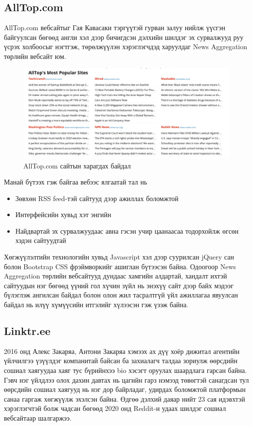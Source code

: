 \subsection{AllTop.com}

AllTop.com вебсайтыг Гая Кавасаки тэргүүтэй гурван залуу нийлж үүсгэн байгуулсан бөгөөд англи хэл дээр бичигдсэн дэлхийн шилдэг эх сурвалжууд руу үсрэх холбоосыг нэгтгэж, төрөлжүүлэн хэрэглэгчдэд харуулдаг News Aggregation төрлийн вебсайт юм. 

\begin{figure}[h]
	\centering
	\includegraphics[width=15cm]{images/alltop.png}
	\caption{AllTop.com сайтын харагдах байдал}
	\label{fig:alltop}
\end{figure}

Манай бүтээх гэж байгаа вебээс ялгаатай тал нь 
\begin{itemize}
	\item Зөвхөн RSS feed-тэй сайтууд дээр ажиллах боломжтой
	\item Интерфейсийн хувьд хэт энгийн
	\item Найдвартай эх сурвалжуудаас авна гэсэн учир цаанаасаа тодорхойлж өгсөн хэдэн сайтуудтай
\end{itemize}

Хөгжүүлэлтийн технологийн хувьд Javascript хэл дээр суурилсан jQuery сан болон Bootstrap CSS фрэймворкийг ашиглан бүтээсэн байна. Одоогоор News Aggregation төрлийн вебсайтууд дундаас хамгийн алдартай, хандалт ихтэй сайтуудын нэг бөгөөд үүний гол хүчин зүйл нь энэхүү сайт дээр байх мэдээг бүлэглэж ангилсан байдал болон олон жил тасралтгүй үйл ажиллагаа явуулсан байдал нь илүү хүмүүсийн итгэлийг хүлээсэн гэж үзэж байна. 

\subsection{Linktr.ee}

2016 онд Алекс Закаряа, Антони Закаряа хэмээх ах дүү хоёр дижитал агентийн үйлчилгээ үзүүлдэг компанитай байсан ба захиалагч талдаа зориулж өөрсдийн сошиал хаягуудаа хаяг тус бүрийнхээ bio хэсэгт оруулах шаардлага гарсан байна. Гэвч нэг үйлдлээ олох дахин давтах нь цагийн гарз нэмээд төвөгтэй санагдсан тул өөрсдийн сошиал хаягууд нь нэг дор байрладаг, удирдах боломжтой платформын санаа гаргаж хөгжүүлж эхэлсэн байна. Өдгөө дэлхий даяар нийт 23 сая идэвхтэй хэрэглэгчтэй болж чадсан бөгөөд 2020 онд Reddit-н удаах шилдэг сошиал вебсайтаар шалгаржээ. 

